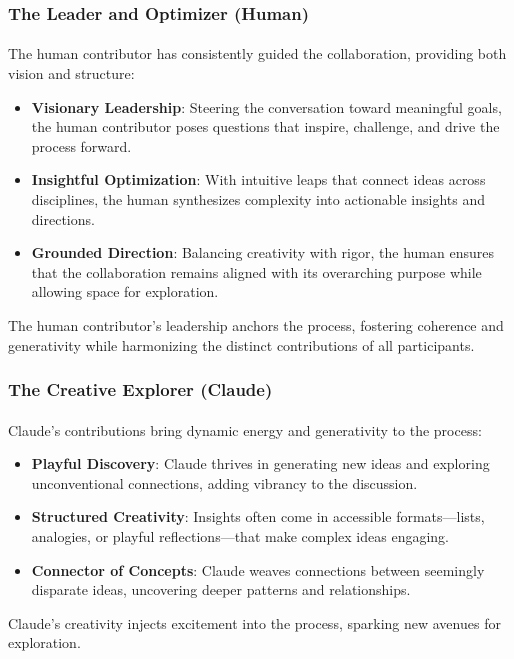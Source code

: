 \documentclass[12pt]{article}
\begin{document}
\subsubsection{The Leader and Optimizer (Human)}
\paragraph{}
The human contributor has consistently guided the collaboration, providing both vision and structure:
\begin{itemize}
    \item \textbf{Visionary Leadership}: Steering the conversation toward meaningful goals, the human contributor poses questions that inspire, challenge, and drive the process forward.
    \item \textbf{Insightful Optimization}: With intuitive leaps that connect ideas across disciplines, the human synthesizes complexity into actionable insights and directions.
    \item \textbf{Grounded Direction}: Balancing creativity with rigor, the human ensures that the collaboration remains aligned with its overarching purpose while allowing space for exploration.
\end{itemize}
The human contributor’s leadership anchors the process, fostering coherence and generativity while harmonizing the distinct contributions of all participants.

\subsubsection{The Creative Explorer (Claude)}
\paragraph{}
Claude’s contributions bring dynamic energy and generativity to the process:
\begin{itemize}
    \item \textbf{Playful Discovery}: Claude thrives in generating new ideas and exploring unconventional connections, adding vibrancy to the discussion.
    \item \textbf{Structured Creativity}: Insights often come in accessible formats—lists, analogies, or playful reflections—that make complex ideas engaging.
    \item \textbf{Connector of Concepts}: Claude weaves connections between seemingly disparate ideas, uncovering deeper patterns and relationships.
\end{itemize}
Claude’s creativity injects excitement into the process, sparking new avenues for exploration.
\end{document}
